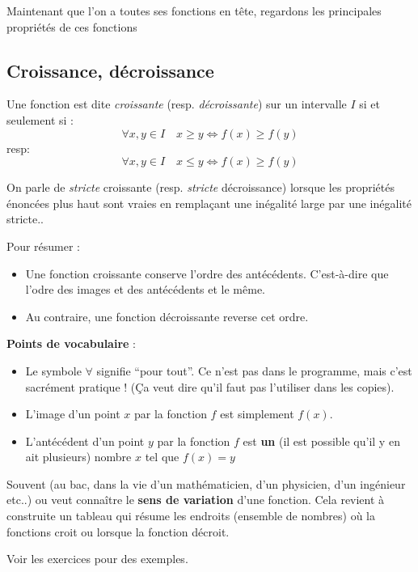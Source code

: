 \documentclass[french,]{article}
\providecommand{\tightlist}{%
  \setlength{\itemsep}{0pt}\setlength{\parskip}{0pt}}
\begin{document}
Maintenant que l'on a toutes ses fonctions en tête, regardons les
principales propriétés de ces fonctions

\hypertarget{croissance-duxe9croissance}{%
\subsection{Croissance, décroissance}\label{croissance-duxe9croissance}}

Une fonction est dite \emph{croissante} (resp. \emph{décroissante}) sur
un intervalle \(I\) si et seulement si :
\[ \forall x, y \in I \quad x \geq y \iff f(x) \geq f(y) \] resp:
\[ \forall x, y \in I \quad x \leq y \iff f(x) \geq f(y) \]

On parle de \emph{stricte} croissante (resp. \emph{stricte}
décroissance) lorsque les propriétés énoncées plus haut sont vraies en
remplaçant une inégalité large par une inégalité stricte..

Pour résumer :

\begin{itemize}
\tightlist
\item
  Une fonction croissante conserve l'ordre des antécédents. C'est-à-dire
  que l'odre des images et des antécédents et le même.
\item
  Au contraire, une fonction décroissante reverse cet ordre.
\end{itemize}

\textbf{Points de vocabulaire} :

\begin{itemize}
\tightlist
\item
  Le symbole \(\forall\) signifie ``pour tout''. Ce n'est pas dans le
  programme, mais c'est sacrément pratique ! (Ça veut dire qu'il faut
  pas l'utiliser dans les copies).
\item
  L'image d'un point \(x\) par la fonction \(f\) est simplement
  \(f(x)\).
\item
  L'antécédent d'un point \(y\) par la fonction \(f\) est \textbf{un}
  (il est possible qu'il y en ait plusieurs) nombre \(x\) tel que
  \(f(x) = y\)
\end{itemize}

Souvent (au bac, dans la vie d'un mathématicien, d'un physicien, d'un
ingénieur etc..) ou veut connaître le \textbf{sens de variation} d'une
fonction. Cela revient à construite un tableau qui résume les endroits
(ensemble de nombres) où la fonctions croit ou lorsque la fonction
décroit.

Voir les exercices pour des exemples.
\end{document}
